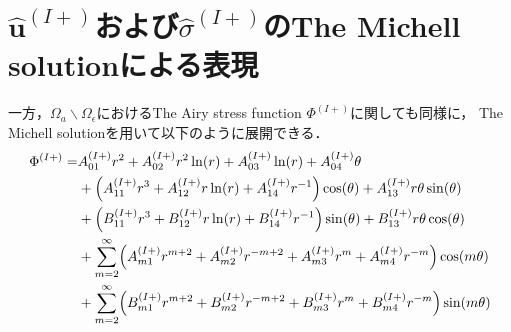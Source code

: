 \section{$\hat{\bm{u}}^{(I+)}$および$\hat{\sigma}^{(I+)}$のThe Michell solutionによる表現}

一方，$\Omega_{a}\backslash\Omega_\epsilon$におけるThe Airy stress function $\Phi^{(I+)}$に関しても同様に，
The Michell solutionを用いて以下のように展開できる．
\begin{align}
\Phi^{(I+)} =&A_{01}^{(I+)}r^2+A_{02}^{(I+)}r^2\ln(r)+A_{03}^{(I+)}\ln(r)+A_{04}^{(I+)}\theta
\nonumber
\\
&+\Bigl(A_{11}^{(I+)}r^3+A_{12}^{(I+)}r\ln(r)+A_{14}^{(I+)}r^{-1}\Bigr)\cos(\theta)+A_{13}^{(I+)}r\theta \sin(\theta)
\nonumber
\\
&+\Bigl(B_{11}^{(I+)}r^3+B_{12}^{(I+)}r\ln(r)+B_{14}^{(I+)}r^{-1}\Bigr)\sin(\theta)+B_{13}^{(I+)}r\theta \cos(\theta)
\nonumber
\\
&+\sum_{m=2}^{\infty}\Bigl(A_{m1}^{(I+)}r^{m+2}+A_{m2}^{(I+)}r^{-m+2}
+A_{m3}^{(I+)}r^{m}+A_{m4}^{(I+)}r^{-m}\Bigr)\cos(m\theta)
\nonumber
\\
&+\sum_{m=2}^{\infty}\Bigl(B_{m1}^{(I+)}r^{m+2}+B_{m2}^{(I+)}r^{-m+2}
+B_{m3}^{(I+)}r^{m}+B_{m4}^{(I+)}r^{-m}\Bigr)\sin(m\theta)
\label{eq:AiryOut1}
\end{align}

